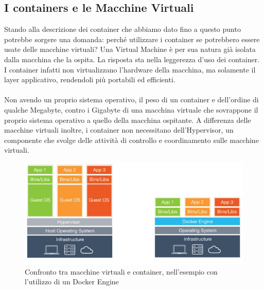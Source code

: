 \subsection{I containers e le Macchine Virtuali}
Stando alla descrizione dei container che abbiamo dato fino a questo punto potrebbe sorgere una domanda: perché utilizzare i container se potrebbero essere usate delle macchine virtuali? Una Virtual Machine è per sua natura già isolata dalla macchina che la ospita. La risposta sta nella leggerezza d'uso dei container. I container infatti non virtualizzano l'hardware della macchina, ma solamente il layer applicativo, rendendoli più portabili ed efficienti.

\paragraph{}
Non avendo un proprio sistema operativo, il peso di un container e dell'ordine di qualche Megabyte, contro i Gigabyte di una macchina virtuale che sovrappone il proprio sistema operativo a quello della macchina ospitante. A differenza delle macchine virtuali inoltre, i container non necessitano dell'Hypervisor, un componente che svolge delle attività di controllo e coordinamento sulle macchine virtuali. 

\begin{figure}[h!]
	\centering
	\includegraphics[width=\textwidth,keepaspectratio=true]{capitoli/imgs/ContainersvsVms.PNG}
	\caption{Confronto tra macchine virtuali e container, nell'esempio con l'utilizzo di un Docker Engine}
\end{figure}

